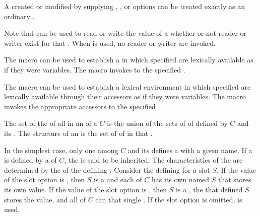 A  created or modified by supplying ,
, or   options can be treated exactly
as an ordinary .
           
Note that  can be used to read or write the value of a
 whether or not reader or writer  exist for that
.  When  is used, no reader or writer
 are invoked.

The macro  can be used to establish a 
 in which specified  are lexically
available as if they were variables.  The macro  
invokes  to  the specified .

The macro  can be used to establish a lexical
environment in which specified  are lexically available through
their accessors as if they were variables.  The macro 
invokes the appropriate accessors to  the specified . 

\endsubSection%

The set of the  of all   
in an  of a  $C$ is the union of 
the sets of  of  defined by $C$ and its
. The structure of an  is
the set of  of  in that .

In the simplest case, only one  among $C$ and its 
defines a  with a given  name.  
If a  is defined by a  of $C$\negthinspace, 
the  is said to be inherited.  The characteristics 
of the  are determined by the 
of the defining .
Consider the defining  for
a slot $S$\negthinspace.  If the value of the  
slot
option is , then $S$ is a  and each 
of $C$ has its own  named $S$ that stores its own value.  If the
value of the  slot 
option is , then $S$
is a , the  
that defined $S$ stores the value, and all
 of $C$ can  that single .  
If the  slot option is omitted,  is used.

